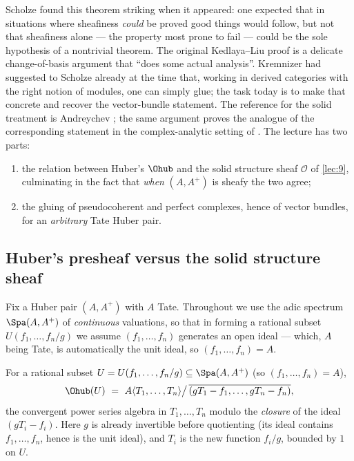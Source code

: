 \begin{remark}
\label{rmk:10:history}
Scholze found this theorem striking when it appeared: one expected that in
situations where sheafiness \emph{could} be proved good things would follow, but
not that sheafiness alone --- the property most prone to fail --- could be the
sole hypothesis of a nontrivial theorem. The original Kedlaya--Liu proof is a
delicate change-of-basis argument that ``does some actual analysis''. Kremnizer
had suggested to Scholze already at the time that, working in derived categories
with the right notion of modules, one can simply glue; the task today is to make
that concrete and recover the vector-bundle statement. The reference for the
solid treatment is Andreychev
\cite{andreychev2021pseudocoherentperfectcomplexesvector}; the same argument
proves the analogue of the corresponding statement in the complex-analytic
setting of \cite{clausen2020analytic}. The lecture has two parts:
\begin{enumerate}
\item the relation between Huber's $\Ohub$ and the solid structure sheaf $\mathcal O$
of \cref{lec:9}, culminating in the fact that \emph{when} $(A,A^{+})$ is sheafy
the two agree;
\item the gluing of pseudocoherent and perfect complexes, hence of vector
bundles, for an \emph{arbitrary} Tate Huber pair.
\end{enumerate}
\end{remark}

\subsection{Huber's presheaf versus the solid structure sheaf}

Fix a Huber pair $(A,A^{+})$ with $A$ Tate. Throughout we use the adic spectrum
$\Spa(A,A^{+})$ of \emph{continuous} valuations, so that in forming a rational
subset $U(f_{1},\dots,f_{n}/g)$ we assume $(f_{1},\dots,f_{n})$ generates an open
ideal --- which, $A$ being Tate, is automatically the unit ideal, so
$(f_{1},\dots,f_{n})=A$.

\begin{proposition}
\label{prop:10:huber-presheaf}
For a rational subset $U=U(f_{1},\dots,f_{n}/g)\subseteq\Spa(A,A^{+})$ (so
$(f_{1},\dots,f_{n})=A$),
\begin{equation}
\label{eq:10:huber-presheaf}
\Ohub(U)\ =\ A\langle T_{1},\dots,T_{n}\rangle\big/\,\overline{(gT_{1}-f_{1},\dots,gT_{n}-f_{n})},
\end{equation}
the convergent power series algebra in $T_{1},\dots,T_{n}$ modulo the
\emph{closure} of the ideal $(gT_{i}-f_{i})$. Here $g$ is already invertible
before quotienting (its ideal contains $f_{1},\dots,f_{n}$, hence is the unit
ideal), and $T_{i}$ is the new function $f_{i}/g$, bounded by $1$ on $U$.
\end{proposition}

